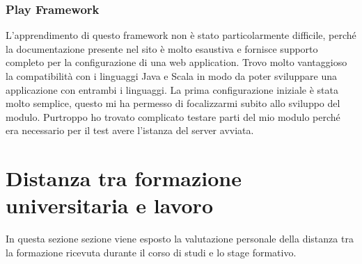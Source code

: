 \subsubsection{Play Framework}
L'apprendimento di questo framework non è stato particolarmente difficile, perché la documentazione presente nel sito è molto esaustiva e fornisce supporto completo per la configurazione di una web application. Trovo molto vantaggioso la compatibilità con i linguaggi Java e Scala in modo da poter sviluppare una applicazione con entrambi i linguaggi. La prima configurazione iniziale è stata molto semplice, questo mi ha permesso di focalizzarmi subito allo sviluppo del modulo. Purtroppo ho trovato complicato testare parti del mio modulo perché era necessario per il test avere l'istanza del server avviata.




\section{Distanza tra formazione universitaria e lavoro}
In questa sezione sezione viene esposto la valutazione personale della distanza tra la formazione ricevuta durante il corso di studi e lo stage formativo.

